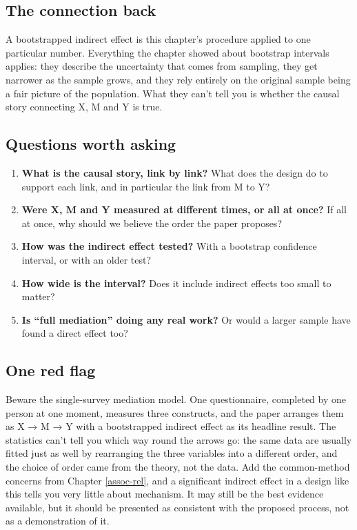 \documentclass[
]{book}
\providecommand{\tightlist}{%
  \setlength{\itemsep}{0pt}\setlength{\parskip}{0pt}}
\begin{document}
\subsection{The connection back}\label{the-connection-back-4}

A bootstrapped indirect effect is this chapter's procedure applied to one particular number. Everything the chapter showed about bootstrap intervals applies: they describe the uncertainty that comes from sampling, they get narrower as the sample grows, and they rely entirely on the original sample being a fair picture of the population. What they can't tell you is whether the causal story connecting X, M and Y is true.

\subsection{Questions worth asking}\label{questions-worth-asking-4}

\begin{enumerate}
\def\labelenumi{\arabic{enumi}.}
\tightlist
\item
  \textbf{What is the causal story, link by link?} What does the design do to support each link, and in particular the link from M to Y?
\item
  \textbf{Were X, M and Y measured at different times, or all at once?} If all at once, why should we believe the order the paper proposes?
\item
  \textbf{How was the indirect effect tested?} With a bootstrap confidence interval, or with an older test?
\item
  \textbf{How wide is the interval?} Does it include indirect effects too small to matter?
\item
  \textbf{Is ``full mediation'' doing any real work?} Or would a larger sample have found a direct effect too?
\end{enumerate}

\subsection{One red flag}\label{one-red-flag-4}

Beware the single-survey mediation model. One questionnaire, completed by one person at one moment, measures three constructs, and the paper arranges them as X → M → Y with a bootstrapped indirect effect as its headline result. The statistics can't tell you which way round the arrows go: the same data are usually fitted just as well by rearranging the three variables into a different order, and the choice of order came from the theory, not the data. Add the common-method concerns from Chapter \ref{assoc-rel}, and a significant indirect effect in a design like this tells you very little about mechanism. It may still be the best evidence available, but it should be presented as consistent with the proposed process, not as a demonstration of it.
\end{document}
